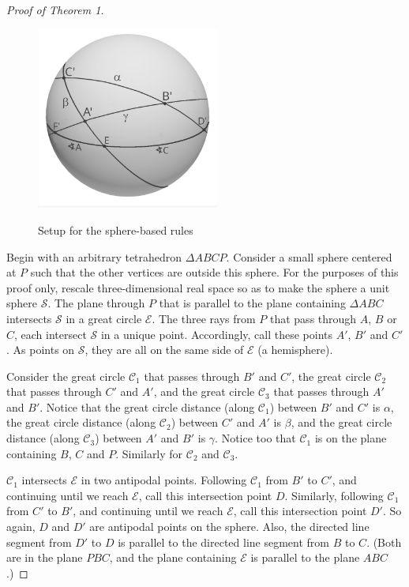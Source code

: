 \documentclass[a4paper, twoside]{article}
\begin{document}
\begin{proof}[Proof of Theorem 1] 

\begin{figure} 
\centerline{ \includegraphics[width=6cm]{sphere2.jpg} \ }
\caption{Setup for the sphere-based rules} 
\end{figure} 


Begin with an arbitrary tetrahedron $\Delta ABCP$. Consider a small sphere centered at $P$ such that the other vertices are outside this sphere. For the purposes of this proof only, rescale three-dimensional real space so as to make the sphere a unit sphere $\mathcal{S}$. The plane through $P$ that is parallel to the plane containing $\Delta ABC$ intersects $\mathcal{S}$ in a great circle $\mathcal{E}$. The three rays from $P$ that pass through $A$, $B$ or $C$, each intersect $\mathcal{S}$ in a unique point. Accordingly, call these points $A'$, $B'$ and $C'$. As points on $\mathcal{S}$, they are all on the same side of $\mathcal{E}$ (a hemisphere). 

Consider the great circle $\mathcal{C}_1$ that passes through $B'$ and $C'$, the great circle $\mathcal{C}_2$ that passes through $C'$ and $A'$, and the great circle $\mathcal{C}_3$ that passes through $A'$ and $B'$. Notice that the great circle distance (along $\mathcal{C}_1$) between $B'$ and $C'$ is $\alpha$, the great circle distance (along $\mathcal{C}_2$) between $C'$ and $A'$ is $\beta$, and the great circle distance (along $\mathcal{C}_3$) between $A'$ and $B'$ is $\gamma$. Notice too that $\mathcal{C}_1$ is on the plane containing $B$, $C$ and $P$. Similarly for $\mathcal{C}_2$ and $\mathcal{C}_3$.

$\mathcal{C}_1$ intersects $\mathcal{E}$ in two antipodal points. Following $\mathcal{C}_1$ from $B'$ to $C'$, and continuing until we reach $\mathcal{E}$, call this intersection point $D$. Similarly, following $\mathcal{C}_1$ from $C'$ to $B'$, and continuing until we reach $\mathcal{E}$, call this intersection point $D'$. So again, $D$ and $D'$ are antipodal points on the sphere. Also, the directed line segment from $D'$ to $D$ is parallel to the directed line segment from $B$ to $C$. (Both are in the plane $PBC$, and the plane containing $\mathcal{E}$ is parallel to the plane $ABC$.)


\end{proof}
\end{document}
